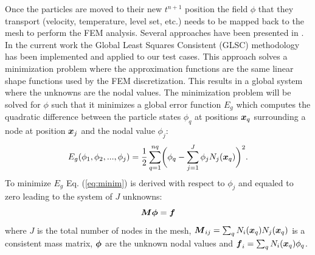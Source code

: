 Once the particles are moved to their new $t^{n+1}$ position the field $\phi$ that they transport (velocity, temperature, level set, etc.) needs to be mapped back to the mesh to perform the FEM analysis. Several approaches have been presented in \cite{gimenez:tesis}. In the current work the Global Least Squares Consistent (GLSC) methodology has been implemented and applied to our test cases. This approach solves a minimization problem where the approximation functions are the same linear shape functions used by the FEM discretization. This results in a global system where the unknowns are the nodal values. The minimization problem will be solved for $\phi$ such that it minimizes a global error function $E_g$ which computes the quadratic difference between the particle states $\phi_q$ at positions $\boldsymbol{x}_q$ surrounding a node at position $\boldsymbol{x}_j$ and the nodal value $\phi_j$:
%
\begin{equation}\label{eq:minim}
  E_g(\phi_1,\phi_2,...,\phi_j)=\frac{1}{2}\sum_{q=1}^{nq} \biggl(\phi_q-\sum_{j=1}^J\phi_jN_j(\boldsymbol{x}_q)\biggr)^2.
\end{equation}
%
To minimize $E_g$ Eq. (\ref{eq:minim}) is derived with respect to $\phi_j$ and equaled to zero leading to the system of $J$ unknowns:
%
\begin{equation}\label{eq:mapptom}
  \boldsymbol{M}\boldsymbol{\phi}=\boldsymbol{f}
\end{equation}
%
where $J$ is the total number of nodes in the mesh, $\boldsymbol{M}_{ij}=\sum_qN_i(\boldsymbol{x}_q)N_j(\boldsymbol{x}_q)$ is a consistent mass matrix, $\boldsymbol{\phi}$ are the unknown nodal values and $\boldsymbol{f}_i=\sum_qN_i(\boldsymbol{x}_q)\phi_q$.

